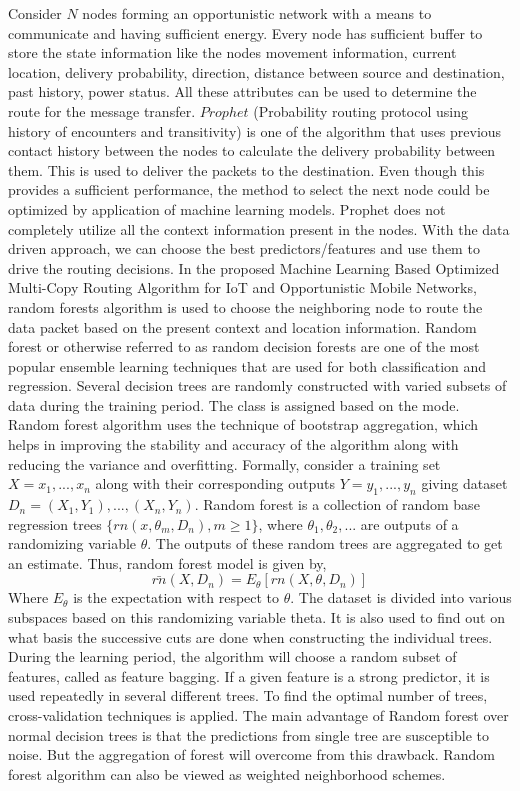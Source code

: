 \documentclass[10pt,journal]{IEEEtran}
\begin{document}
Consider $N$ nodes forming an opportunistic network with a means to communicate and having sufficient energy. Every node has sufficient buffer to store the state information like the nodes movement information, current location, delivery probability, direction, distance between source and destination, past history, power status. All these attributes can be used to determine the route for the message transfer. $Prophet$ (Probability routing protocol using history of encounters and transitivity) is one of the algorithm that uses previous contact history between the nodes to calculate the delivery probability between them. This is used to deliver the packets to the destination. Even though this provides a sufficient performance, the method to select the next node could be optimized by application of machine learning models. Prophet does not completely utilize all the context information present in the nodes. With the data driven approach, we can choose the best predictors/features and use them to drive the routing decisions. 
In the proposed Machine Learning Based Optimized Multi-Copy Routing Algorithm for IoT and Opportunistic Mobile Networks, random forests algorithm is used to choose the neighboring node to route the data packet based on the present context and location information.  Random forest or otherwise referred to as random decision forests are one of the most popular ensemble learning techniques that are used for both classification and regression. Several decision trees are randomly constructed with varied subsets of data during the training period. The class is assigned based on the mode. Random forest algorithm uses the technique of bootstrap aggregation, which helps in improving the stability and accuracy of the algorithm along with reducing the variance and overfitting. Formally, consider a training set $X = x_1, ..., x_n$ along with their corresponding outputs $Y = y_1, ..., y_n$ giving dataset $D_n={(X_1,Y_1),...,(X_n,Y_n)}$. Random forest is a collection of random base regression trees $\{rn(x,\theta_m,D_n),m\ge1\}$, where $\theta_1,\theta_2,...$ are outputs of a randomizing variable $\theta$. The outputs of these random trees are aggregated to get an estimate. Thus, random forest model is given by,  
\begin{equation}
	\bar{rn}(X,D_n) =E_\theta[rn(X,\theta,D_n)]
\end{equation}
Where $E_\theta$ is the expectation with respect to $\theta$. The dataset is divided into various subspaces based on this randomizing variable theta. It is also used to find out on what basis the successive cuts are done when constructing the individual trees. During the learning period, the algorithm will choose a random subset of features, called as feature bagging. If a given feature is a strong predictor, it is used repeatedly in several different trees. To find the optimal number of trees, cross-validation techniques is applied. The main advantage of Random forest over normal decision trees is that the predictions from single tree are susceptible to noise. But the aggregation of forest will overcome from this drawback. Random forest algorithm can also be viewed as weighted neighborhood schemes.   
\end{document}
